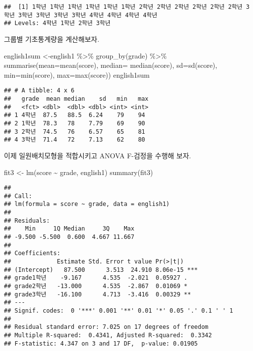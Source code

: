 \documentclass[
]{book}
\newenvironment{Shaded}{\begin{snugshade}}{\end{snugshade}}
\newcommand{\AttributeTok}[1]{\textcolor[rgb]{0.77,0.63,0.00}{#1}}
\newcommand{\FunctionTok}[1]{\textcolor[rgb]{0.00,0.00,0.00}{#1}}
\newcommand{\NormalTok}[1]{#1}
\newcommand{\OtherTok}[1]{\textcolor[rgb]{0.56,0.35,0.01}{#1}}
\newcommand{\SpecialCharTok}[1]{\textcolor[rgb]{0.00,0.00,0.00}{#1}}
\begin{document}
\begin{verbatim}
##  [1] 1학년 1학년 1학년 1학년 1학년 1학년 2학년 2학년 2학년 2학년 2학년 2학년 3학년 3학년 3학년 3학년 3학년 4학년 4학년 4학년 4학년
## Levels: 4학년 1학년 2학년 3학년
\end{verbatim}

그룹별 기초통계량을 계산해보자.

\begin{Shaded}
\begin{Highlighting}[]
\NormalTok{english1sum }\OtherTok{\textless{}{-}}\NormalTok{english1 }\SpecialCharTok{\%\textgreater{}\%} \FunctionTok{group\_by}\NormalTok{(grade)  }\SpecialCharTok{\%\textgreater{}\%}  \FunctionTok{summarise}\NormalTok{(}\AttributeTok{mean=}\FunctionTok{mean}\NormalTok{(score), }\AttributeTok{median=} \FunctionTok{median}\NormalTok{(score), }\AttributeTok{sd=}\FunctionTok{sd}\NormalTok{(score), }\AttributeTok{min=}\FunctionTok{min}\NormalTok{(score), }\AttributeTok{max=}\FunctionTok{max}\NormalTok{(score))}
\NormalTok{english1sum }
\end{Highlighting}
\end{Shaded}

\begin{verbatim}
## # A tibble: 4 x 6
##   grade  mean median    sd   min   max
##   <fct> <dbl>  <dbl> <dbl> <int> <int>
## 1 4학년  87.5   88.5  6.24    79    94
## 2 1학년  78.3   78    7.79    69    90
## 3 2학년  74.5   76    6.57    65    81
## 4 3학년  71.4   72    7.13    62    80
\end{verbatim}

이제 일원배치모형을 적합시키고 ANOVA F-검정을 수행해 보자.

\begin{Shaded}
\begin{Highlighting}[]
\NormalTok{fit3 }\OtherTok{\textless{}{-}} \FunctionTok{lm}\NormalTok{(score }\SpecialCharTok{\textasciitilde{}}\NormalTok{ grade, english1)}
\FunctionTok{summary}\NormalTok{(fit3)}
\end{Highlighting}
\end{Shaded}

\begin{verbatim}
## 
## Call:
## lm(formula = score ~ grade, data = english1)
## 
## Residuals:
##    Min     1Q Median     3Q    Max 
## -9.500 -5.500  0.600  4.667 11.667 
## 
## Coefficients:
##             Estimate Std. Error t value Pr(>|t|)    
## (Intercept)   87.500      3.513  24.910 8.06e-15 ***
## grade1학년    -9.167      4.535  -2.021  0.05927 .  
## grade2학년   -13.000      4.535  -2.867  0.01069 *  
## grade3학년   -16.100      4.713  -3.416  0.00329 ** 
## ---
## Signif. codes:  0 '***' 0.001 '**' 0.01 '*' 0.05 '.' 0.1 ' ' 1
## 
## Residual standard error: 7.025 on 17 degrees of freedom
## Multiple R-squared:  0.4341, Adjusted R-squared:  0.3342 
## F-statistic: 4.347 on 3 and 17 DF,  p-value: 0.01905
\end{verbatim}
\end{document}
